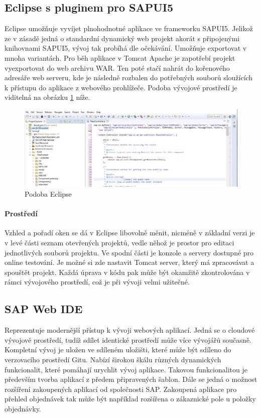 \documentclass[thesis=M,czech]{FITthesis}[2012/06/26]
\begin{document}
\subsection{Eclipse s pluginem pro SAPUI5}
\label{ssec:eclipse_sapui5}
Eclipse umožňuje vyvíjet plnohodnotné aplikace ve frameworku SAPUI5. Jelikož ze v zásadě jedná o standardní dynamický web projekt akorát s připojenými knihovnami SAPUI5, vývoj tak probíhá dle očekávání. Umožňuje exportovat v mnoha variantách. Pro běh aplikace v Tomcat Apache je zapotřebí projekt vyexportovat do web archivu WAR. Ten poté stačí nahrát do kořenového adresáře web serveru, kde je následně rozbalen do potřebných souborů sloužících k přístupu do aplikace z webového prohlížeče. Podoba vývojové prostředí je viditelná na obrázku \ref{img:eclipse_design} níže. 
\begin{figure}[H]
	\centering
	\includegraphics[width=1\textwidth]{images/eclipse_design}
	\caption{Podoba Eclipse}
	\label{img:eclipse_design}
\end{figure}
\paragraph{Prostředí} 
Vzhled a pořadí oken se dá v Eclipse libovolně měnit, nicméně v základní verzi je v levé části seznam otevřených projektů, vedle něhož je prostor pro editaci jednotlivých souborů projektu. Ve spodní části je konzole a servery dostupné pro online testování. Je možné si zde nastavit Tomcat server, který má zpracovávat a spouštět projekt. Každá úprava v kódu pak může být okamžitě zkontrolována v rámci vývojového prostředí, což je při vývoji velmi užitečné. 

\subsection{SAP Web IDE}
\label{ssec:sap_web_ide}
Reprezentuje modernější přístup k vývoji webových aplikací. Jedná se o cloudové vývojové prostředí, tudíž sdílet identické prostředí může více vývojářů současně. Kompletní vývoj je uložen ve sdíleném uložišti, které může být sdíleno do verzovacího prostředí Gitu. Nabízí širokou škálu různých dynamických funkcionalit, které pomáhají urychlit vývoj aplikace. Takovou funkcionalitou je především tvorba aplikací z předem připravených šablon. Dále se jedná o možnost rozšíření zakoupených aplikací od společnosti SAP. Zakoupená aplikace pro přehled objednávek tak může být například rozšířena o zákaznické pole u položky objednávky.
\end{document}
